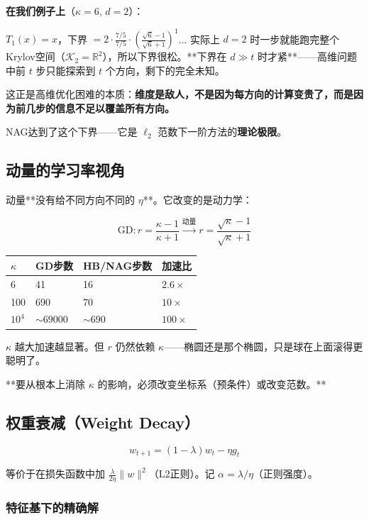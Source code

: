 \documentclass[12pt,a4paper]{article}
\begin{document}
\textbf{在我们例子上}（$\kappa = 6$, $d = 2$）：

$T_1(x) = x$，下界 $= 2 \cdot \frac{7/5}{7/5} \cdot (\frac{\sqrt{6}-1}{\sqrt{6}+1})^1$... 实际上 $d = 2$ 时一步就能跑完整个Krylov空间（$\mathcal{K}_2 = \mathbb{R}^2$），所以下界很松。**下界在 $d \gg t$ 时才紧**——高维问题中前 $t$ 步只能探索到 $t$ 个方向，剩下的完全未知。

这正是高维优化困难的本质：\textbf{维度是敌人，不是因为每方向的计算变贵了，而是因为前几步的信息不足以覆盖所有方向。}

NAG达到了这个下界——它是 $\ell_2$ 范数下一阶方法的\textbf{理论极限}。


\subsection{动量的学习率视角}

动量**没有给不同方向不同的 $\eta$**。它改变的是动力学：


\[\text{GD}: r = \frac{\kappa-1}{\kappa+1} \xrightarrow{\text{动量}} r = \frac{\sqrt\kappa-1}{\sqrt\kappa+1}\]






\begin{center}\small
\begin{longtable}{|l|l|l|l|}
\hline
$\kappa$ & GD步数 & HB/NAG步数 & 加速比 \\
\hline
6 & 41 & 16 & $2.6\times$ \\
100 & 690 & 70 & $10\times$ \\
$10^4$ & $\sim 69000$ & $\sim 690$ & $100\times$ \\
\hline
\end{longtable}
\end{center}


$\kappa$ 越大加速越显著。但 $r$ 仍然依赖 $\kappa$——椭圆还是那个椭圆，只是球在上面滚得更聪明了。

**要从根本上消除 $\kappa$ 的影响，必须改变坐标系（预条件）或改变范数。**


\subsection{权重衰减（Weight Decay）}

\[w_{t+1} = (1 - \lambda)w_t - \eta g_t\]

等价于在损失函数中加 $\frac{\lambda}{2\eta}\|w\|^2$（L2正则）。记 $\alpha = \lambda/\eta$（正则强度）。

\subsubsection{特征基下的精确解}
\end{document}
